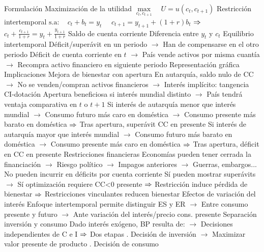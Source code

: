 \documentclass{nuevotema}
\begin{document}
\begin{esquemal}
			\3 Formulación
				\4 Maximización de la utilidad
				\4[] $\underset{c_t,c_{t+1}}{\max} \quad U = u(c_t, c_{t+1}) $
				\4 Restricción intertemporal
				\4[] $\text{s.a:} \quad \, c_t + b_t = y_t$
				\4[] \quad \quad \, \, $c_{t+1} = y_{t+1} + (1+r) b_t$
				\4[] $\Rightarrow$ \quad \, $c_t + \frac{c_{t+1}}{1+r} = y_t + \frac{y_{t+1}}{1+r}$
				\4 Saldo de cuenta corriente
				\4[] Diferencia entre $y_t$ y $c_t$
				\4 Equilibrio intertemporal
				\4[] Déficit/superávit en un periodo
				\4[] $\to$ Han de compensarse en el otro periodo
				\4[] Déficit de cuenta corriente en $t$
				\4[] $\to$ País vende activos por misma cuantía
				\4[] $\to$ Recompra activo financiero en siguiente periodo
				\4 Representación gráfica
				\4[] 
			\3 Implicaciones
				\4 Mejora de bienestar con apertura
				\4[] En autarquía, saldo nulo de CC
				\4[] $\to$ No se venden/compran activos financieros
				\4[] $\to$ Interés implícito: tangencia CI-dotación
				\4[] Apertura beneficiosa si interés mundial distinto
				\4[] $\to$ País tendrá ventaja comparativa en $t$ o $t+1$
				\4[] Si interés de autarquía menor que interés mundial
				\4[] $\to$ Consumo futuro más caro en doméstica
				\4[] $\to$ Consumo presente más barato en doméstica
				\4[] $\Rightarrow$ Tras apertura, superávit CC en presente
				\4[] Si interés de autarquía mayor que interés mundial
				\4[] $\to$ Consumo futuro más barato en doméstica
				\4[] $\to$ Consumo presente más caro en doméstica
				\4[] $\Rightarrow$ Tras apertura, déficit en CC en presente
				\4[] 
				\4 Restricciones financieras
				\4[] Economías pueden tener cerrada la financiación
				\4[] $\to$ Riesgo político
				\4[] $\to$ Impagos anteriores
				\4[] $\to$ Guerras, embargos...
				\4[] No pueden incurrir en déficits por cuenta corriente
				\4[] Sí pueden mostrar superávits
				\4[] $\to$ Sí optimización requiere CC<0 presente
				\4[] $\Rightarrow$ Restricción induce pérdida de bienestar
				\4[] $\Rightarrow$ Restricciones vinculantes reducen bienestar
				\4[] 
				\4 Efectos de variación del interés
				\4[] Enfoque intertemporal permite distinguir ES y ER
				\4[] $\to$ Entre consumo presente y futuro
				\4[] $\to$ Ante variación del interés/precio cons. presente
				\4[] 
				\4 Separación inversión y consumo
				\4[] Dado interés exógeno, BP resulta de:
				\4[] $\to$ Decisiones independientes de C e I
				\4[] $\Rightarrow$ Dos etapas
				. Decisión de inversión
				\4[] $\to$ Maximizar valor presente de producto
				. Decisión de consumo

\end{esquemal}
\end{document}
